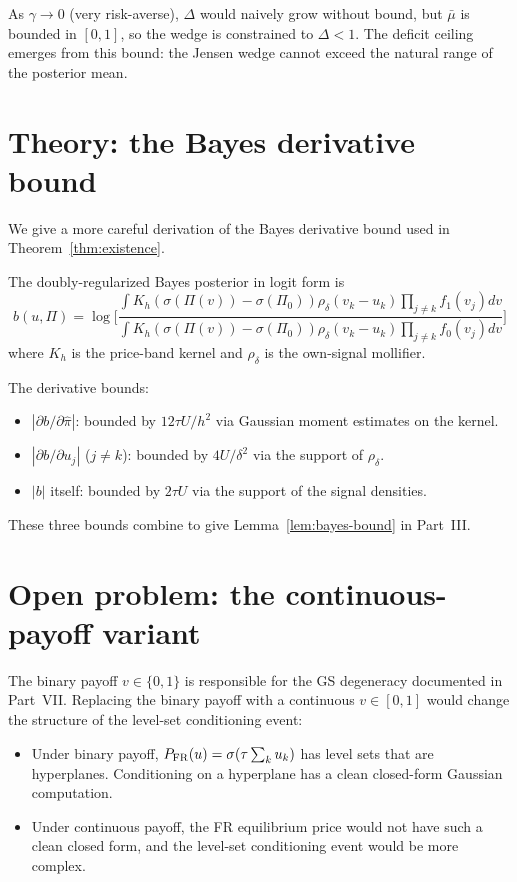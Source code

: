\documentclass[11pt]{article}
\newcommand{\1}{\mathbf{1}}
\newcommand{\PFR}{P_{\rm FR}}
\begin{document}
As $\gamma \to 0$ (very risk-averse), $\Delta$ would naively grow
without bound, but $\bar \mu$ is bounded in $[0, 1]$, so the wedge is
constrained to $\Delta < 1$.  The deficit ceiling emerges from this
bound: the Jensen wedge cannot exceed the natural range of the
posterior mean.

\section{Theory: the Bayes derivative bound}

We give a more careful derivation of the Bayes derivative bound used
in Theorem~\ref{thm:existence}.

The doubly-regularized Bayes posterior in logit form is
\begin{equation}
b(u, \Pi) = \log\biggl[\frac{\int K_h(\sigma(\Pi(v)) - \sigma(\Pi_0)) \rho_\delta(v_k - u_k) \prod_{j \ne k} f_1(v_j) dv}{\int K_h(\sigma(\Pi(v)) - \sigma(\Pi_0)) \rho_\delta(v_k - u_k) \prod_{j \ne k} f_0(v_j) dv}\biggr]
\end{equation}
where $K_h$ is the price-band kernel and $\rho_\delta$ is the
own-signal mollifier.

The derivative bounds:
\begin{itemize}
\item $|\partial b / \partial \hat \pi|$: bounded by $12 \tau U / h^2$
via Gaussian moment estimates on the kernel.
\item $|\partial b / \partial u_j|$ ($j \ne k$): bounded by $4U/\delta^2$
via the support of $\rho_\delta$.
\item $|b|$ itself: bounded by $2\tau U$ via the support of the signal
densities.
\end{itemize}

These three bounds combine to give Lemma~\ref{lem:bayes-bound} in
Part~III.

\section{Open problem: the continuous-payoff variant}
\label{app:cont}

The binary payoff $v \in \{0, 1\}$ is responsible for the GS degeneracy
documented in Part~VII.  Replacing the binary payoff with a continuous
$v \in [0, 1]$ would change the structure of the level-set
conditioning event:

\begin{itemize}
\item Under binary payoff, $\PFR(u) = \sigma(\tau \sum_k u_k)$ has
level sets that are hyperplanes.  Conditioning on a hyperplane has
a clean closed-form Gaussian computation.
\item Under continuous payoff, the FR equilibrium price would not have
such a clean closed form, and the level-set conditioning event would
be more complex.
\end{itemize}
\end{document}
